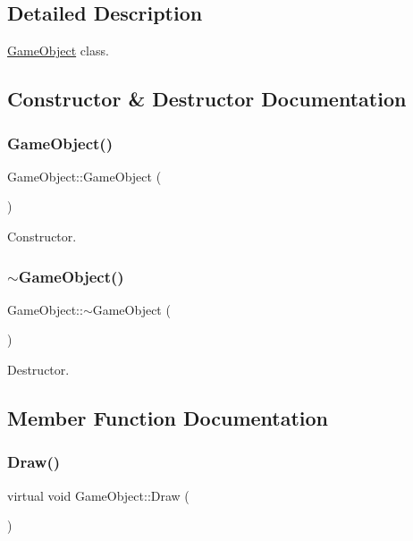 \subsection{Detailed Description}
\mbox{\hyperlink{class_game_object}{Game\+Object}} class. 

\subsection{Constructor \& Destructor Documentation}
\mbox{\label{class_game_object_a0348e3ee2e83d56eafca7a3547f432c4}} 
\subsubsection{\texorpdfstring{GameObject()}{GameObject()}}
{\footnotesize\ttfamily Game\+Object\+::\+Game\+Object (\begin{DoxyParamCaption}{ }\end{DoxyParamCaption})}



Constructor. 

\mbox{\label{class_game_object_ab82dfdb656f9051c0587e6593b2dda97}} 
\subsubsection{\texorpdfstring{$\sim$GameObject()}{~GameObject()}}
{\footnotesize\ttfamily Game\+Object\+::$\sim$\+Game\+Object (\begin{DoxyParamCaption}{ }\end{DoxyParamCaption})}



Destructor. 



\subsection{Member Function Documentation}
\mbox{\label{class_game_object_a29a665f46fda87982825bc5c0ca6a888}} 
\subsubsection{\texorpdfstring{Draw()}{Draw()}}
{\footnotesize\ttfamily virtual void Game\+Object\+::\+Draw (\begin{DoxyParamCaption}{ }\end{DoxyParamCaption})\hspace{0.3cm}{\ttfamily [pure virtual]}}




